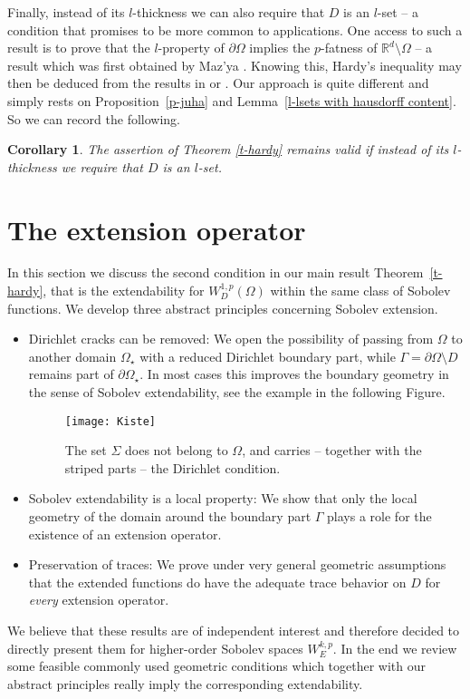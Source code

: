 \documentclass[10pt,leqno]{amsart}
\newtheorem{corollary}[theorem]{Corollary}
\theoremstyle{definition}
\numberwithin{equation}{section}
\begin{document}
Finally, instead of its $l$-thickness we can also require that $D$ is an
$l$-set -- a condition that promises to be more common to
applications. One access to such a result is to
prove that the $l$-property of $\partial \Omega$ implies the $p$-fatness of
${{\mathbb R}}^d \setminus \Omega$ -- a result which was first obtained by Maz'ya
\cite{mazcomm}. Knowing this, Hardy's inequality may then be deduced from the
results in \cite{lewis} or \cite{Wannebo}. Our approach is quite different and
simply rests on Proposition~\ref{p-juha} and Lemma~\ref{l-lsets with hausdorff
content}. So we can record the following.

\begin{corollary} \label{c-dminus1}
The assertion of Theorem \ref{t-hardy} remains valid if instead of
its $l$-thickness we require that $D$ is an $l$-set.
\end{corollary}

\section{The extension operator} \label{extens}
\noindent In this section we discuss the second condition in our main result
Theorem~\ref{t-hardy}, that is the extendability for $W^{1,p}_D(\Omega)$ within
the same class of Sobolev functions. We develop three abstract principles
concerning Sobolev extension.

\begin{itemize}
\item Dirichlet cracks can be removed: We open the possibility of passing from
$\Omega$ to another domain
$\Omega_\star$ with a reduced Dirichlet boundary part, while $\Gamma = \partial
\Omega \setminus D$ remains part of $\partial \Omega_\star$. In most cases this
improves the boundary geometry in the sense of Sobolev extendability, see the
example in the following Figure.

\begin{figure}[htbp]
\centerline{\texttt{[image: Kiste]}}
\caption{\label{fig-Kiste} 
The set $\Sigma$ does not belong to $\Omega$, and carries -- together with the
striped parts -- the Dirichlet condition.}
\end{figure}

\item Sobolev extendability is a local property: We show that only the local
geometry of the domain around the boundary
part $\Gamma$ plays a role for the existence of an extension operator.

\item Preservation of traces: We prove under very general geometric assumptions
that the extended
functions do have the adequate trace behavior on $D$ for \emph{every} extension
operator.
\end{itemize}
We believe that these results are of independent interest and therefore decided
to directly present them for higher-order Sobolev spaces $W_E^{k,p}$. In the
end we review some feasible commonly used geometric conditions which together
with our abstract principles really imply the corresponding extendability.
\end{document}
